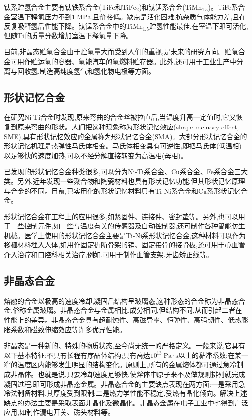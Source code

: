 \documentclass[UTF8]{ctexbook}
\newcommand{\◎}{\ensuremath{\bigcirc}}
\begin{document}
钛系贮氢合金主要有钛铁系合金(TiFe和$\mathrm{TiFe_2}$)和钛锰系合金($\mathrm{TiMn_{1.5}}$)。TiFe系合金室温下释氢压力不到$1~\mathrm{MPa}$,且价格低。缺点是活化困难,抗杂质气体能力差,且在反复吸释氢后性能下降。钛锰系合金中的$\mathrm{TiMn_{1.5}}$贮氢性能最佳,在室温下即可活化,但随Ti的质量分数增加室温下释氢量下降。

目前,非晶态贮氢合金由于贮氢量大而受到人们的重视,是未来的研究方向。贮氢合金可用作贮运氢的容器、氢能汽车的氢燃料贮存器。此外,还可用于工业生产中分离与回收氢,制造高纯度氢气和氢化物电极等方面。

\subsection{形状记忆合金}

在研究Ni-Ti合金时发现,原来弯曲的合金丝被拉直后,当温度升高一定值时,它又恢复到原来弯曲的形状。人们把这种现象称为形状记忆效应(shape memory effect, SME),具有形状记忆效应的金属称为形状记忆合金(SMA)。大部分形状记忆合金的形状记忆机理是热弹性马氏体相变。马氏体相变具有可逆性,即把马氏体(低温相)以足够快的速度加热,可以不经分解直接转变为高温相(母相)。

已发现的形状记忆合金种类很多,可以分为Ni-Ti系合金、Cu系合金、Fe系合金三大类。另外,近年发现一些聚合物和陶瓷材料也具有形状记忆功能,但其形状记忆原理与合金的不同。目前,已实用化的形状记忆材料只有Ti-Ni系合金和Cu系形状记忆合金。

形状记忆合金在工程上的应用很多,如紧固件、连接件、密封垫等。另外,也可以用于一些控制元件,如一些与温度有关的传感器及自动控制器,还可制作各种智能仿生机械。医学上使用的形状记忆合金主要是Ti-Ni系形状记忆合金,这种材料可以作为移植材料埋入人体,如用作固定折断骨架的销、固定接骨的接骨板,还可用于心血管介入治疗和口腔科相关治疗,例如,可用于制作血管支架,牙齿矫正线等。

\subsection{非晶态合金}

熔融的合金以极高的速度冷却,凝固后结构呈玻璃态,这种形态的合金称为非晶态合金,俗称金属玻璃。非晶态合金与金属相比,成分相同,但结构不同,从而引起二者在性能上的差异。非晶态合金具有超耐蚀性、高磁导率、恒弹性、高强韧性、低热膨胀系数和磁致伸缩效应等许多优异性能。

非晶态是一种新的、特殊的物质状态,至今尚无统一的严格定义。一般来说,它具有以下基本特征:不具有长程有序晶体结构;具有高达$10^{13}~\mathrm{Pa\cdot s}$以上的黏滞系数;在某一窄的温度区内能够发生明显的结构变化。原则上,所有的金属熔体都可通过急冷制成非晶体。也就是说,只要冷却速度足够快,使熔体中原子来不及做规则排列就完成凝固过程,即可形成非晶态金属。非晶态合金的主要缺点表现在两方面:一是采用急冷法制备材料,其厚度受到限制;二是热力学性能不稳定,受热有晶化倾向。解决上述缺点的办法主要是采取表面非晶化及微晶化。非晶态金属在电子工业中也得到广泛应用,如制作漏电开关、磁头材料等。
\end{document}
